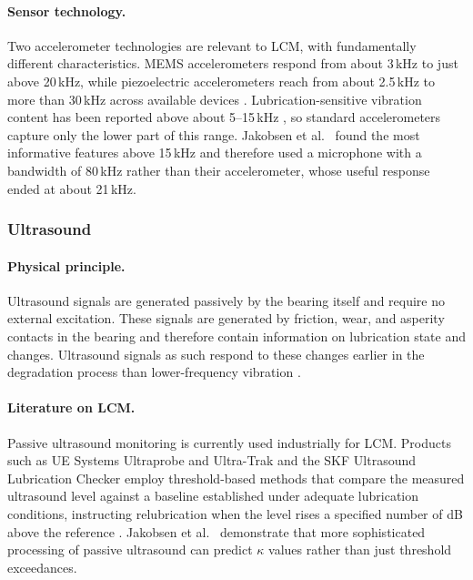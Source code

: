 \paragraph{Sensor technology.}
Two accelerometer technologies are relevant to LCM, with fundamentally different characteristics. MEMS accelerometers respond from about 3\,kHz to just above 20\,kHz, while piezoelectric accelerometers reach from about 2.5\,kHz to more than 30\,kHz across available devices \cite{murphy_choosing_2020}. Lubrication-sensitive vibration content has been reported above about 5--15\,kHz \cite{jakobsen_vibration_2021,jakobsen_detecting_2023}, so standard accelerometers capture only the lower part of this range. Jakobsen et al.\ \cite{jakobsen_detecting_2023} found the most informative features above 15\,kHz and therefore used a microphone with a bandwidth of 80\,kHz rather than their accelerometer, whose useful response ended at about 21\,kHz.

\subsubsection{Ultrasound}
\label{subsubsec:ultrasound_passive}

\paragraph{Physical principle.} Ultrasound signals are generated passively by the bearing itself and require no external excitation. These signals are generated by friction, wear, and asperity contacts in the bearing and therefore contain information on lubrication state and changes. Ultrasound signals as such respond to these changes earlier in the degradation process than lower-frequency vibration \cite{jakobsen_detecting_2023}.

\paragraph{Literature on LCM.} Passive ultrasound monitoring is currently used industrially for LCM. Products such as UE Systems Ultraprobe and Ultra-Trak \cite{ue_systems_ultraprobe_2026,ue_systems_ultra-trak_2026} and the SKF Ultrasound Lubrication Checker \cite{skf_ultrasound_2026} employ threshold-based methods that compare the measured ultrasound level against a baseline established under adequate lubrication conditions, instructing relubrication when the level rises a specified number of dB above the reference \cite{lineham_ultrasonic_2008}. Jakobsen et al.\ \cite{jakobsen_detecting_2023} demonstrate that more sophisticated processing of passive ultrasound can predict $\kappa$ values rather than just threshold exceedances.

